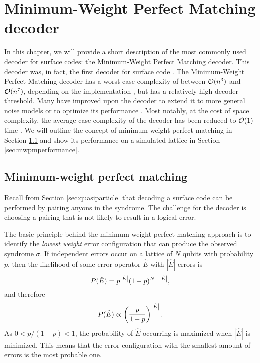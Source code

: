 
\chapter{Minimum-Weight Perfect Matching decoder}\label{ch:mwpm}

In this chapter, we will provide a short description of the most commonly used decoder for surface codes: the Minimum-Weight Perfect Matching decoder. This decoder was, in fact, the first decoder for surface code \cite{dennis2002topological}. The Minimum-Weight Perfect Matching decoder has a worst-case complexity of between $\mathcal{O}(n^3)$ and $\mathcal{O}(n^7)$, depending on the implementation \cite{edmonds1965paths, kolmogorov2009blossom}, but has a relatively high decoder threshold. Many have improved upon the decoder to extend it to more general noise models or to optimize its performance \cite{fowler2012towards, fowler2012surface, fowler2013optimal, stace2009thresholds, stace2010error}. Most notably, at the cost of space complexity, the average-case complexity of the decoder has been reduced to $\mathcal{O}(1)$ time \cite{fowler2013minimum}. We will outline the concept of minimum-weight perfect matching in Section \ref{sec:mwpm} and show its performance on a simulated lattice in Section \ref{sec:mwpmperformance}.

\section{Minimum-weight perfect matching}\label{sec:mwpm}

Recall from Section \ref{sec:quasiparticle} that decoding a surface code can be performed by pairing anyons in the syndrome. The challenge for the decoder is choosing a pairing that is not likely to result in a logical error. 

The basic principle behind the minimum-weight perfect matching approach is to identify the \emph{lowest weight} error configuration that can produce the observed syndrome $\sigma$. If independent errors occur on a lattice of $N$ qubits with probability $p$, then the likelihood of some error operator $\hat{E}$ with $|\hat{E}|$ errors is
\begin{equation}
  P(\hat{E}) = p^{\abs{\hat{E}}}(1-p)^{N-\abs{\hat{E}}},
\end{equation}
and therefore
\begin{equation}
  P(\hat{E})\propto \left(\frac{p}{1-p}\right)^\abs{\hat{E}}.
\end{equation}
As $0<p/(1-p)<1$, the probability of $\hat{E}$ occurring is maximized when $|\hat{E}|$ is minimized. This means that the error configuration with the smallest amount of errors is the most probable one. 

